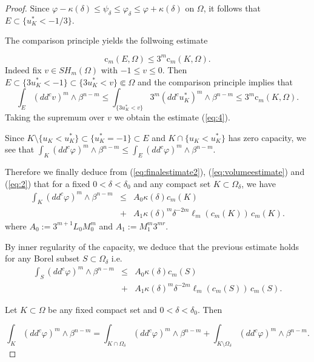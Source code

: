 \documentclass[12pt]{amsart}
\theoremstyle{definition}
\numberwithin{theorem}{section}
\numberwithin{equation}{section}
\begin{document}
{\begin{proof}
Since  $\varphi - \kappa (\delta) \leq \psi_\delta  \leq  \varphi_{\delta}  \leq \varphi + \kappa (\delta)$  on $\Omega$, it follows that  
 $ E \subset\{u_K^* < - 1 \slash 3\}.$ 
 
The comparison principle yields the follwoing estimate

 \begin{equation}\label{eq:4}
  \text{c}_m  (E,\Omega) \leq 3^{m}   \text{c}_m (K,\Omega).
 \end{equation}
Indeed fix $v \in SH_m (\Omega)$ with $- 1 \leq v \leq 0$. Then $ E \subset\{ 3 u_K^* < - 1 \} \subset \{3 u_K^* < v\} \Subset \Omega$ and  the comparison principle implies that
 $$
 \int_{E} (dd^c v)^m \wedge \beta^{n - m} \leq  \int_{\{ 3 u_K^* <  v\}} 3^m  (dd^c u_K^*)^m \wedge \beta^{n - m} \leq 3^m \text{c}_m (K,\Omega).
 $$
Taking the supremum over $v$ we obtain the estimate (\ref{eq:4}).

Since $K \setminus \{u_K < u_K^*\} \subset  \{ u_K^* = - 1\} \subset E$ and $K \cap \{u_K < u_K^*\}$ has zero capacity, we see that $\int_K (dd^c\varphi)^m\wedge\beta^{n-m} \leq  \int_E (dd^c\varphi)^m\wedge\beta^{n-m}$. 

Therefore  we finally deduce from (\ref{eq:finalestimate2}), (\ref{eq:volumeestimate}) and  (\ref{eq:2}) that  for a fixed $0 < \delta < \delta_0$ and any compact set $K \subset \Omega_\delta$,  we have 
\begin{eqnarray*}
\int_K (dd^c\varphi)^m\wedge\beta^{n-m} &\leq & A_0 \kappa (\delta)  c_m (K) \\
&+& A_1  \kappa (\delta)^m \delta^{-2m}   \ell_m (c_m (K)) \,  c_m (K).
\end{eqnarray*} 
where $A_0 :=  3^{m + 1}  L_0 M_0^m$ and $A_1 :=  M_1^{m}  3^{m r}  $.


By inner regularity of the capacity, we deduce that the previous estimate holds for any Borel subset $S \subset \Omega_\delta$ i.e.
\begin{eqnarray} \label{eq:estimate1}
\int_S (dd^c\varphi)^m\wedge\beta^{n-m} &\leq & A_0 \kappa (\delta)  c_m (S) \\
& +&  A_1 \kappa (\delta)^m \delta^{-2m}   \ell_m (c_m (S)) \,  c_m (S). \nonumber
\end{eqnarray} 

Let $K \subset \Omega$ be any fixed compact set and $0 < \delta < \delta_0$. Then

$$
\int_K (dd^c\varphi)^m\wedge\beta^{n-m}  = \int_{K \cap \Omega_\delta} (dd^c\varphi)^m\wedge\beta^{n-m}  + \int_{K \setminus \Omega_\delta} (dd^c\varphi)^m\wedge\beta^{n-m}.
$$


\end{proof}}
\end{document}

